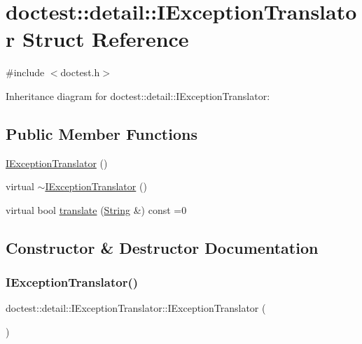 \hypertarget{structdoctest_1_1detail_1_1IExceptionTranslator}{}\section{doctest\+:\+:detail\+:\+:I\+Exception\+Translator Struct Reference}
\label{structdoctest_1_1detail_1_1IExceptionTranslator}


{\ttfamily \#include $<$doctest.\+h$>$}



Inheritance diagram for doctest\+:\+:detail\+:\+:I\+Exception\+Translator\+:
\subsection*{Public Member Functions}
\begin{DoxyCompactItemize}
\item 
\hyperlink{structdoctest_1_1detail_1_1IExceptionTranslator_a3818157edf68f08110c7212ee87ff61e}{I\+Exception\+Translator} ()
\item 
virtual \hyperlink{structdoctest_1_1detail_1_1IExceptionTranslator_a9031aa45964213709841eba4b3e19d48}{$\sim$\+I\+Exception\+Translator} ()
\item 
virtual bool \hyperlink{structdoctest_1_1detail_1_1IExceptionTranslator_a9c56005e4c83c13b859cc2e31102bfbc}{translate} (\hyperlink{classdoctest_1_1String}{String} \&) const =0
\end{DoxyCompactItemize}


\subsection{Constructor \& Destructor Documentation}
\mbox{\label{structdoctest_1_1detail_1_1IExceptionTranslator_a3818157edf68f08110c7212ee87ff61e}} 
\subsubsection{\texorpdfstring{I\+Exception\+Translator()}{IExceptionTranslator()}}
{\footnotesize\ttfamily doctest\+::detail\+::\+I\+Exception\+Translator\+::\+I\+Exception\+Translator (\begin{DoxyParamCaption}{ }\end{DoxyParamCaption})}

